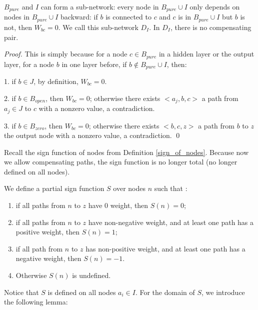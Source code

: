 			\begin{lemma}\label{lem:subnetwork}
				$B_{pure}$ and $I$ can form a sub-network: every node in $B_{pure}\cup I$ only depends on nodes in $B_{pure}\cup I$ backward: if $b$ is connected to $c$ and $c$ is in $B_{pure}\cup I$ but $b$ is not, then $W_{bc}=0$. We call this sub-network $D_I$. In $D_I$, there is no compensating pair.
			\end{lemma}
			
			\begin{proof}
				This is simply because for a node $c\in B_{pure}$ in a hidden layer or the output layer, for a node $b$ in one layer before, if $b\notin B_{pure}\cup I$, then:
				
				1. if $b\in J$, by definition, $W_{bc}=0$.
				
				2. if $b\in B_{open}$, then $W_{bc}=0$; otherwise there exists $<a_j,b,c>$ a path from $a_j\in J$ to $c$ with a nonzero value, a contradiction.
				
				3. if $b\in B_{zero}$, then $W_{bc}=0$; otherwise there exists $<b,c,z>$ a path from $b$ to $z$ the output node with a nonzero value, a contradiction. \qed
			\end{proof}
			
			
			
			Recall the sign function of nodes from Definition \ref{sign_of_nodes}. Because now we allow compensating paths, the sign function is no longer total (no longer defined on all nodes).
			
			
			
			
			\begin{definition}\label{sign_of_nodes_in_I_2}
				We define a partial sign function $S$ over nodes $n$ such that : 	
				\begin{enumerate} 
					\item if all paths from $n$ to $z$ have 0 weight, then $S(n)=0$; 
					\item if all paths from $n$ to $z$ have non-negative weight, and at least one path has a positive weight, then $S(n)=1$; 
					\item if all path from $n$ to $z$ has non-positive weight, and at least one path has a negative weight, then $S(n)=-1$.
					\item Otherwise $S(n)$ is undefined.
				\end{enumerate}
			\end{definition}	
			
			Notice that $S$ is defined on all nodes $a_i \in I$. For the domain of $S$, we introduce the following lemma:
			
